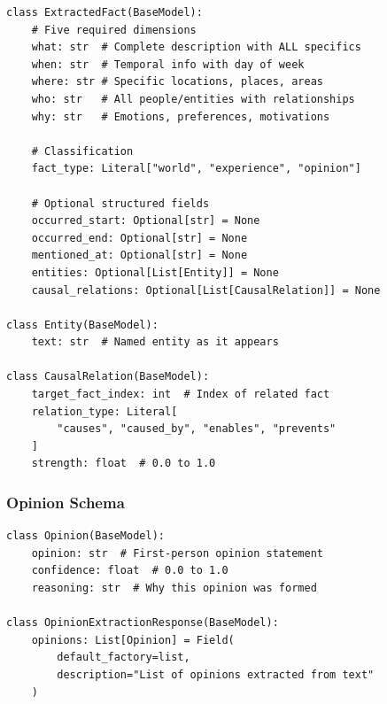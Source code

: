 \begin{tcolorbox}[
    colback=teal!5!white,
    colframe=teal!60!black,
    title=Fact Extraction Schema (Pydantic),
    fonttitle=\bfseries,
    coltitle=white,
    colbacktitle=teal!60!black,
    boxrule=1.0pt,
    arc=1.5mm,
    enhanced,
    breakable
]
\small
\begin{verbatim}
class ExtractedFact(BaseModel):
    # Five required dimensions
    what: str  # Complete description with ALL specifics
    when: str  # Temporal info with day of week
    where: str # Specific locations, places, areas
    who: str   # All people/entities with relationships
    why: str   # Emotions, preferences, motivations

    # Classification
    fact_type: Literal["world", "experience", "opinion"]

    # Optional structured fields
    occurred_start: Optional[str] = None
    occurred_end: Optional[str] = None
    mentioned_at: Optional[str] = None
    entities: Optional[List[Entity]] = None
    causal_relations: Optional[List[CausalRelation]] = None

class Entity(BaseModel):
    text: str  # Named entity as it appears

class CausalRelation(BaseModel):
    target_fact_index: int  # Index of related fact
    relation_type: Literal[
        "causes", "caused_by", "enables", "prevents"
    ]
    strength: float  # 0.0 to 1.0
\end{verbatim}
\end{tcolorbox}

\subsubsection{Opinion Schema}

\begin{tcolorbox}[
    colback=teal!5!white,
    colframe=teal!60!black,
    title=Opinion Extraction Schema (Pydantic),
    fonttitle=\bfseries,
    coltitle=white,
    colbacktitle=teal!60!black,
    boxrule=1.0pt,
    arc=1.5mm,
    enhanced,
    breakable
]
\small
\begin{verbatim}
class Opinion(BaseModel):
    opinion: str  # First-person opinion statement
    confidence: float  # 0.0 to 1.0
    reasoning: str  # Why this opinion was formed

class OpinionExtractionResponse(BaseModel):
    opinions: List[Opinion] = Field(
        default_factory=list,
        description="List of opinions extracted from text"
    )
\end{verbatim}
\end{tcolorbox}

